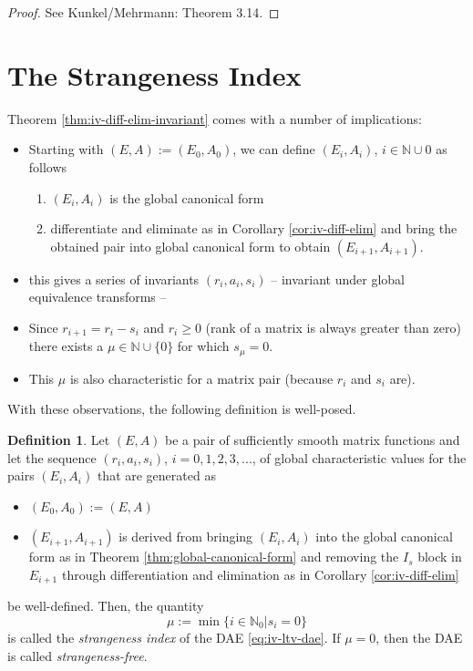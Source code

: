 \documentclass[]{book}
\providecommand{\tightlist}{%
  \setlength{\itemsep}{0pt}\setlength{\parskip}{0pt}}
\theoremstyle{definition}
\newtheorem{definition}{Definition}[chapter]
\theoremstyle{definition}
\theoremstyle{definition}
\theoremstyle{definition}
\theoremstyle{remark}
\begin{document}
\begin{proof}
{}See Kunkel/Mehrmann: Theorem 3.14.
\end{proof}

\hypertarget{the-strangeness-index}{%
\section{The Strangeness Index}\label{the-strangeness-index}}

Theorem \ref{thm:iv-diff-elim-invariant} comes with a number of implications:

\begin{itemize}
\tightlist
\item
  Starting with \((E, A):=(E_0, A_0)\), we can define \((E_i, A_i)\), \(i \in \mathbb N \cup {0}\) as follows

  \begin{enumerate}
  \def\labelenumi{\arabic{enumi}.}
  \tightlist
  \item
    \((E_i, A_i)\) is the global canonical form
  \item
    differentiate and eliminate as in Corollary \ref{cor:iv-diff-elim} and bring the obtained pair into global canonical form to obtain \((E_{i+1}, A_{i+1})\).
  \end{enumerate}
\item
  this gives a series of invariants \((r_i, a_i, s_i)\) -- invariant under global equivalence transforms --
\item
  Since \(r_{i+1} = r_i - s_i\) and \(r_i \geq 0\) (rank of a matrix is always greater than zero) there exists a \(\mu \in \mathbb N \cup \{0\}\) for which \(s_\mu = 0\).
\item
  This \(\mu\) is also characteristic for a matrix pair (because \(r_i\) and \(s_i\) are).
\end{itemize}

With these observations, the following definition is well-posed.

\begin{definition}
\protect\hypertarget{def:iv-strangeness-index}{}{\label{def:iv-strangeness-index} }Let \((E,A)\) be a pair of sufficiently smooth matrix functions and let the sequence \((r_i, a_i, s_i)\), \(i=0,1,2,3,...\), of global characteristic values for the pairs \((E_i, A_i)\) that are generated as

\begin{itemize}
\tightlist
\item
  \((E_0, A_0):= (E, A)\)
\item
  \((E_{i+1}, A_{i+1})\) is derived from bringing \((E_i, A_i)\) into the global canonical form as in Theorem \ref{thm:global-canonical-form} and removing the \(I_s\) block in \(E_{i+1}\) through differentiation and elimination as in Corollary \ref{cor:iv-diff-elim}
\end{itemize}

be well-defined. Then, the quantity
\[
\mu := \min\{i\in \mathbb N_0 | s_i=0\}
\]
is called the \emph{strangeness index} of the DAE \eqref{eq:iv-ltv-dae}. If \(\mu=0\), then the DAE is called \emph{strangeness-free}.
\end{definition}
\end{document}
